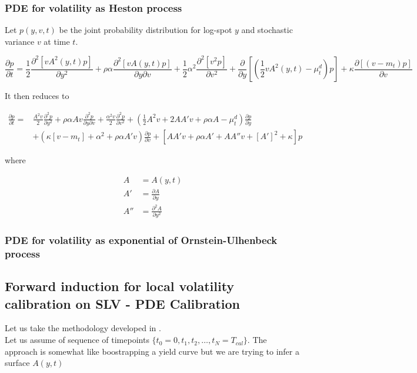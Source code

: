 \documentclass{article}
\begin{document}
\subsubsection{PDE for volatility as Heston process}
Let $p(y,v,t)$ be the joint probability distribution for log-spot $y$ and stochastic variance $v$ at time $t$.

\begin{equation}
	\frac{\partial p}{\partial t} = \frac{1}{2} \frac{\partial^2 \left[vA^2(y,t)p\right]}{\partial y^2} + \rho \alpha \frac{\partial^2 \left[vA(y,t)p\right]}{\partial y \partial v} + \frac{1}{2} \alpha^2 \frac{\partial^2 \left[v^2 p \right]}{\partial v^2} + \frac{\partial }{\partial y} \left[\left(\frac{1}{2} vA^2(y,t) - \mu^d_t\right)p\right] + \kappa \frac{\partial \left[\left(v-m_t\right) p\right]}{\partial v}
\end{equation}

\noindent It then reduces to 

\begin{equation}
\label{eq:SLV}
\begin{aligned}
	\frac{\partial p}{\partial t} =
 &\frac{A^2v}{2}\frac{\partial^2 p}{\partial y^2}
 + \rho \alpha A v \frac{\partial^2 p}{\partial y \partial v} 
+ \frac{\alpha^2 v}{2} \frac{\partial^2 p}{\partial v^2} 
+ \left(\frac{1}{2} A^2 v + 2 A A' v + \rho \alpha A - \mu^d_t\right)\frac{\partial p}{\partial y}\\
& + \left(\kappa \left[v - m_t\right] + \alpha^2 + \rho \alpha A' v\right) \frac{\partial p}{\partial v}
+\left[ AA'v + \rho \alpha A' + AA''v + \left[A'\right]^2 + \kappa\right] p
\end{aligned}
\end{equation}

\noindent where 

\begin{equation}
\begin{aligned}
A&= A(y,t)\\
A' &= \frac{\partial A}{\partial y}\\
A'' &= \frac{\partial^2 A}{\partial y^2}
\end{aligned}
\end{equation}

\subsubsection{PDE for volatility as exponential of Ornstein-Ulhenbeck process}
\subsection{Forward induction for local volatility calibration on SLV - PDE Calibration}
Let us take the methodology developed in \cite{Clark2010}.\\
Let us assume of sequence of timepoints $\{t_0 = 0, t_1, t_2, \dots, t_N = T_{cal}\}$. The approach is somewhat like boostrapping a yield curve but we are trying to infer a surface $A(y,t)$
\end{document}
